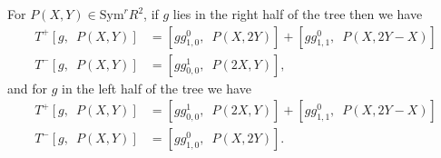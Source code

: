 \documentclass[11pt, reqno]{amsart}
\numberwithin{equation}{section}
\newcommand\Sym{{\mathrm {Sym}}}
\theoremstyle{definition}
\theoremstyle{remark}
\theoremstyle{definition}
\theoremstyle{remark}
\theoremstyle{remark}
\begin{document}
For $P(X,Y)\in\Sym^rR^2$,  if $g$ lies in the right half of the tree then we have 
\begin{equation}
\begin{split}
     T^+[g,\enspace P(X,Y)]&=[gg_{1,0}^{0},\enspace P(X,2Y)]+[g g_{1,1}^{0},  \enspace P(X,2Y-X)] \\
    T^-[g,\enspace P(X,Y)]&=[gg_{0,0}^{1},\enspace P(2X,Y)],  
\end{split}
    \label{Tright}
\end{equation}    
and  for $g$ in the left half of the tree we have
   \begin{equation}
   \begin{split}
    T^{+}[g, \enspace P(X,Y)]&=
    [gg_{0,0}^{1},\enspace  P(2X,Y)]+[gg_{1,1}^{0},\enspace P(X,2Y-X)]\\
    T^-[g,\enspace P(X,Y)]&= [gg_{1,0}^{0},\enspace P(X,2Y)]. 
   \end{split}
   \label{Tleft}
   \end{equation}
\end{document}
